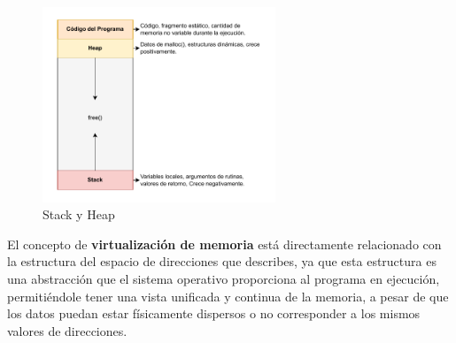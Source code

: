 \documentclass{article}
\begin{document}
\begin{figure}[h]
    \centering
    \includegraphics[width=0.62\textwidth]{src/memory.pdf}
    \caption{Stack y Heap}
\end{figure}

El concepto de \textbf{virtualización de memoria} está directamente relacionado con la estructura del espacio de direcciones que describes, ya que esta estructura es una abstracción que el sistema operativo proporciona al programa en ejecución, permitiéndole tener una vista unificada y continua de la memoria, a pesar de que los datos puedan estar físicamente dispersos o no corresponder a los mismos valores de direcciones.
\end{document}
